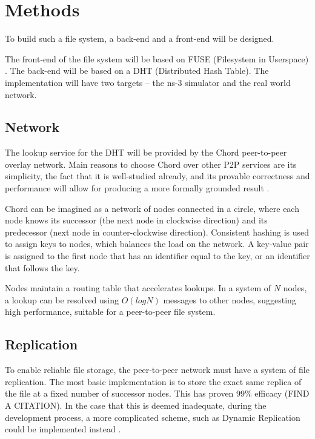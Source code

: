 \documentclass[8pt,a4paper]{article}
\begin{document}
\section{Methods}

To build such a file system, a back-end and a front-end will be designed.

The front-end of the file system will be based on FUSE (Filesystem in Userspace) \cite{fuse}.
The back-end will be based on a DHT (Distributed Hash Table). 
The implementation will have two targets -- the ns-3 \cite{ns3} simulator and the real world network.

\subsection{Network}
The lookup service for the DHT will be provided by the Chord peer-to-peer overlay network. Main reasons to choose Chord over other P2P services are its simplicity, the fact that it is well-studied already, and its provable correctness and performance will allow for producing a more formally grounded result \cite{chord}. %

Chord can be imagined as a network of nodes connected in a circle, where each node knows its successor (the next node in clockwise direction) and its predecessor (next node in counter-clockwise direction). Consistent hashing is used to assign keys to nodes, which balances the load on the network. A key-value pair is assigned to the first node that has an identifier equal to the key, or an identifier that follows the key. 

Nodes maintain a routing table that accelerates lookups. In a system of $N$ nodes, a lookup can be resolved using $O(log N)$ messages to other nodes, suggesting high performance, suitable for a peer-to-peer file system.

\subsection{Replication}
To enable reliable file storage, the peer-to-peer network must have a system of file replication. The most basic implementation is to store the exact same replica of the file at a fixed number of successor nodes. This has proven 99\% efficacy (FIND A CITATION).
In the case that this is deemed inadequate, during the development process, a more complicated scheme, such as Dynamic Replication could be implemented instead \cite{dhash}.
\end{document}
